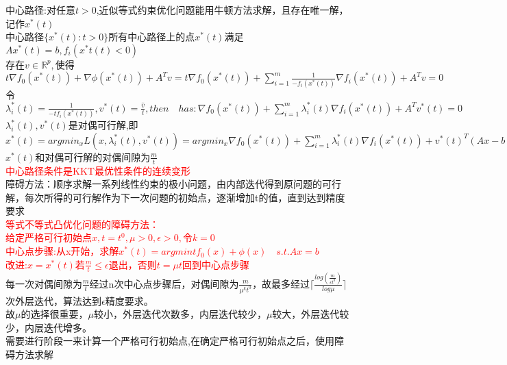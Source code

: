 \documentclass{article}
\begin{document}
中心路径:对任意$t>0$,近似等式约束优化问题能用牛顿方法求解，且存在唯一解，记作$x^*(t)$\\
中心路径$\{x^*(t):t>0\}$所有中心路径上的点$x^*(t)$满足$Ax^*(t) = b,f_i(x^*t(t) < 0)$\\
存在$v \in \mathbb{R}^p,$使得$t\nabla f_0(x^*(t)) + \nabla \phi(x^*(t)) + A^Tv = t\nabla f_0(x^*(t)) + \sum_{i=1}^{m}\frac{1}{-f_i(x^*(t))}\nabla f_i(x^*(t)) + A^Tv = 0$\\
令$\lambda_i^*(t) = \frac{1}{-tf_i(x^*(t))}, v^*(t) = \frac{\hat{v}}{t},then \quad has:\nabla f_0(x^*(t)) + \sum_{i=1}^{m}\lambda_i^*(t) \nabla f_i(x^*(t)) + A^Tv^*(t) = 0$\\
$\lambda_i^*(t),v^*(t)$是对偶可行解,即$x^*(t) = argmin_x L(x,\lambda_i^*(t),v^*(t)) =argmin_x \nabla f_0(x^*(t)) + \sum_{i=1}^{m}\lambda_i^*(t) \nabla f_i(x^*(t)) +v^*(t)^T(Ax-b) $\\
$x^*(t)$和对偶可行解的对偶间隙为$\frac{m}{t}$\\
\textcolor{red}{中心路径条件是KKT最优性条件的连续变形}\\
障碍方法：顺序求解一系列线性约束的极小问题，由内部迭代得到原问题的可行解，每次所得的可行解作为下一次问题的初始点，逐渐增加t的值，直到达到精度要求\\
\textcolor{red}{等式不等式凸优化问题的障碍方法：\\
给定严格可行初始点$x,t = t^0,\mu >0, \epsilon >0, $令$k = 0$\\
中心点步骤:从x开始，求解$x^*(t) = argmintf_0(x) + \phi(x)\quad s.t. Ax=b$\\
改进:$x = x^*(t)$若$\frac{m}{t} \leq \epsilon$退出，否则$t = \mu t$回到中心点步骤}\\
每一次对偶间隙为$\frac{m}{t}$经过n次中心点步骤后，对偶间隙为$\frac{m}{\mu ^k t^0}$，故最多经过$\lceil \frac{log(\frac{m}{\epsilon t^0})}{log \mu} \rceil$次外层迭代，算法达到$\epsilon$精度要求。\\
故$\mu$的选择很重要，$\mu$较小，外层迭代次数多，内层迭代较少，$\mu$较大，外层迭代较少，内层迭代增多。\\
需要进行阶段一来计算一个严格可行初始点,在确定严格可行初始点之后，使用障碍方法求解\\
\end{document}
